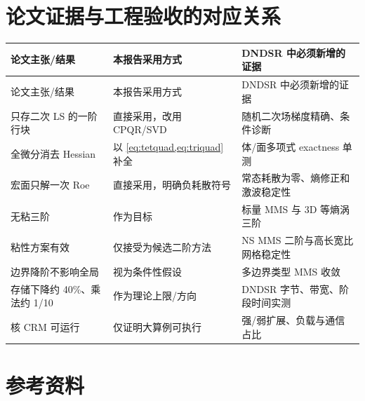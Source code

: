\documentclass[UTF8,a4paper,11pt,openany]{ctexrep}
\numberwithin{equation}{chapter}
\begin{document}
\chapter{论文证据与工程验收的对应关系}

\begin{longtable}{>{\raggedright\arraybackslash}p{}p{}p{}}
\toprule
论文主张/结果 & 本报告采用方式 & DNDSR 中必须新增的证据\\
\midrule
\endfirsthead
\toprule
论文主张/结果 & 本报告采用方式 & DNDSR 中必须新增的证据\\
\midrule
只存二次 LS 的一阶行块 & 直接采用，改用 CPQR/SVD & 随机二次场梯度精确、条件诊断\\
全微分消去 Hessian & 以 \cref{eq:tetquad,eq:triquad} 补全 & 体/面多项式 exactness 单测\\
宏面只解一次 Roe & 直接采用，明确负耗散符号 & 常态耗散为零、熵修正和激波稳定性\\
无粘三阶 & 作为目标 & 标量 MMS 与 3D 等熵涡三阶\\
粘性方案有效 & 仅接受为候选二阶方法 & NS MMS 二阶与高长宽比网格稳定性\\
边界降阶不影响全局 & 视为条件性假设 & 多边界类型 MMS 收敛\\
存储下降约 40\%、乘法约 1/10 & 作为理论上限/方向 & DNDSR 字节、带宽、阶段时间实测\\
512 核 CRM 可运行 & 仅证明大算例可执行 & 强/弱扩展、负载与通信占比\\
\bottomrule
\end{longtable}

\chapter{参考资料}
\end{document}
